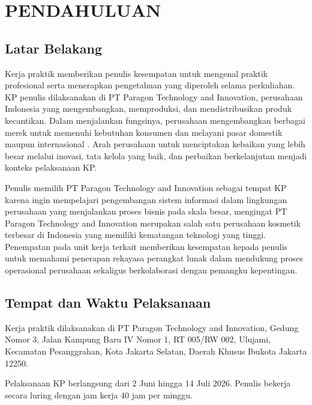 \cleardoublepage %
\chapter{PENDAHULUAN}
\label{chap:pendahuluan}

\section{Latar Belakang}
\label{sec:latar_belakang}
Kerja praktik memberikan penulis kesempatan untuk mengenal praktik profesional serta menerapkan pengetahuan yang diperoleh selama perkuliahan. \label{abbr:KP}KP penulis dilaksanakan di \label{abbr:PT}PT Paragon Technology and Innovation, perusahaan Indonesia yang mengembangkan, memproduksi, dan mendistribusikan produk kecantikan. Dalam menjalankan fungsinya, perusahaan mengembangkan berbagai merek untuk memenuhi kebutuhan konsumen dan melayani pasar domestik maupun internasional \parencite{paragonAbout,paragonLookLab2022}. Arah perusahaan untuk menciptakan kebaikan yang lebih besar melalui inovasi, tata kelola yang baik, dan perbaikan berkelanjutan menjadi konteks pelaksanaan KP.

Penulis memilih PT Paragon Technology and Innovation sebagai tempat KP karena ingin mempelajari pengembangan sistem informasi dalam lingkungan perusahaan yang menjalankan proses bisnis pada skala besar, mengingat PT Paragon Technology and Innovation merupakan salah satu perusahaan kosmetik terbesar di Indonesia yang memiliki kematangan teknologi yang tinggi. Penempatan pada unit kerja terkait memberikan kesempatan kepada penulis untuk memahami penerapan rekayasa perangkat lunak dalam mendukung proses operasional perusahaan sekaligus berkolaborasi dengan pemangku kepentingan.

\section{Tempat dan Waktu Pelaksanaan}
\label{sec:tempat_waktu}
Kerja praktik dilaksanakan di PT Paragon Technology and Innovation, Gedung Nomor 3, Jalan Kampung Baru IV Nomor 1, RT 005/RW 002, Ulujami, Kecamatan Pesanggrahan, Kota Jakarta Selatan, Daerah Khusus Ibukota Jakarta 12250.

Pelaksanaan KP berlangsung dari 2 Juni hingga 14 Juli 2026. Penulis bekerja secara luring dengan jam kerja 40 jam per minggu.

